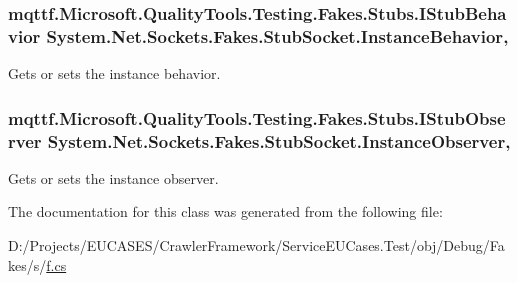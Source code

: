 \hypertarget{class_system_1_1_net_1_1_sockets_1_1_fakes_1_1_stub_socket_ac615acc09043dbd1229f4512cfff335b}{
\subsubsection[{Instance\-Behavior}]{\setlength{\rightskip}{0pt plus 5cm}mqttf.\-Microsoft.\-Quality\-Tools.\-Testing.\-Fakes.\-Stubs.\-I\-Stub\-Behavior System.\-Net.\-Sockets.\-Fakes.\-Stub\-Socket.\-Instance\-Behavior\hspace{0.3cm}{\ttfamily [get]}, {\ttfamily [set]}}}\label{class_system_1_1_net_1_1_sockets_1_1_fakes_1_1_stub_socket_ac615acc09043dbd1229f4512cfff335b}


Gets or sets the instance behavior.

\hypertarget{class_system_1_1_net_1_1_sockets_1_1_fakes_1_1_stub_socket_a16598f57d3cbb330dbe70d7b11b9770c}{
\subsubsection[{Instance\-Observer}]{\setlength{\rightskip}{0pt plus 5cm}mqttf.\-Microsoft.\-Quality\-Tools.\-Testing.\-Fakes.\-Stubs.\-I\-Stub\-Observer System.\-Net.\-Sockets.\-Fakes.\-Stub\-Socket.\-Instance\-Observer\hspace{0.3cm}{\ttfamily [get]}, {\ttfamily [set]}}}\label{class_system_1_1_net_1_1_sockets_1_1_fakes_1_1_stub_socket_a16598f57d3cbb330dbe70d7b11b9770c}


Gets or sets the instance observer.



The documentation for this class was generated from the following file\-:\begin{DoxyCompactItemize}
\item 
D\-:/\-Projects/\-E\-U\-C\-A\-S\-E\-S/\-Crawler\-Framework/\-Service\-E\-U\-Cases.\-Test/obj/\-Debug/\-Fakes/s/\hyperlink{s_2f_8cs}{f.\-cs}\end{DoxyCompactItemize}
